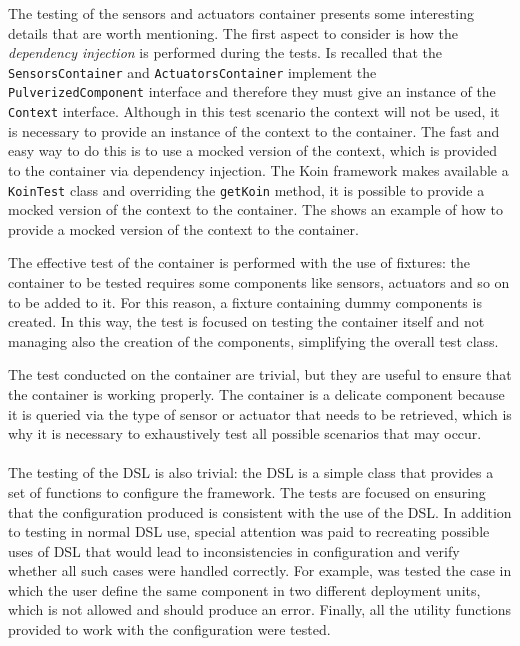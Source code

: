 The testing of the sensors and actuators container presents some interesting details that are worth mentioning.
The first aspect to consider is how the \emph{dependency injection} is performed during the tests. Is recalled that the \texttt{SensorsContainer} and
\texttt{ActuatorsContainer} implement the \texttt{PulverizedComponent} interface and therefore they must give an instance of the \texttt{Context}
interface. Although in this test scenario the context will not be used, it is necessary to provide an instance of the context to the container.
The fast and easy way to do this is to use a mocked version of the context, which is provided to the container via dependency injection.
The Koin framework makes available a \texttt{KoinTest} class and overriding the \texttt{getKoin} method, it is possible to provide a mocked version
of the context to the container. The  shows an example of how to provide a mocked version of the context to the container.



The effective test of the container is performed with the use of fixtures: the container to be tested requires some components like sensors, actuators
and so on to be added to it. For this reason, a fixture containing dummy components is created.
In this way, the test is focused on testing the container itself and not managing also the creation of the components, simplifying the overall test
class.

The test conducted on the container are trivial, but they are useful to ensure that the container is working properly.
The container is a delicate component because it is queried via the type of sensor or actuator that needs to be retrieved, which is why it is
necessary to exhaustively test all possible scenarios that may occur.

\paragraph*{}

The testing of the DSL is also trivial: the DSL is a simple class that provides a set of functions to configure the framework. The tests are focused
on ensuring that the configuration produced is consistent with the use of the DSL.
In addition to testing in normal DSL use, special attention was paid to recreating possible uses of DSL that would lead to inconsistencies in
configuration and verify whether all such cases were handled correctly.
For example, was tested the case in which the user define the same component in two different deployment units, which is not allowed and should
produce an error. Finally, all the utility functions provided to work with the configuration were tested.

